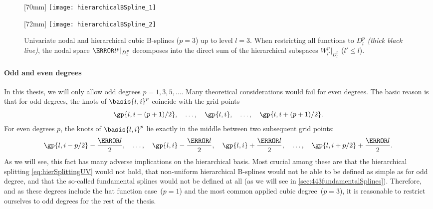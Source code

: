 \begin{figure}
  [70mm]{%
    \texttt{[image: hierarchicalBSpline\_1]}%
  }%
  \hfill%
  \hfill%
  [72mm]{%
    \texttt{[image: hierarchicalBSpline\_2]}%
  }%
  \caption{%
    Univariate nodal and hierarchical cubic B-splines ($p = 3$)
    up to level $l = 3$.
    When restricting all functions to $D_l^p$ \emph{(thick black line)},
    the nodal space $\ns{l}^p|_{D_l^p}$ decomposes into the direct sum
    of the hierarchical subspaces $W_{l'}^p|_{D_l^p}$ ($l' \le l$).%
  }
  \label{fig:hierarchicalBSpline}
\end{figure}

\paragraph{Odd and even degrees}

In this thesis, we will only allow odd degrees $p = 1, 3, 5, \dotsc$.
Many theoretical considerations would fail for even degrees.
The basic reason is that for odd degrees, the knots of
$\basis{l,i}^p$ coincide with the grid points \cite{Valentin14Hierarchische}
\begin{equation}
  \gp{l,i-(p+1)/2},\quad
  \dotsc,\quad
  \gp{l,i},\quad
  \dotsc,\quad
  \gp{l,i+(p+1)/2}.
\end{equation}
For even degrees $p$, the knots of $\basis{l,i}^p$ lie exactly in
the middle between two subsequent grid points:
\begin{equation}
  \gp{l,i-p/2} - \frac{\ms{l}}{2},\quad
  \dotsc,\quad
  \gp{l,i} - \frac{\ms{l}}{2},\quad
  \gp{l,i} + \frac{\ms{l}}{2},\quad
  \dotsc,\quad
  \gp{l,i+p/2} + \frac{\ms{l}}{2}.
\end{equation}
As we will see,
this fact has many adverse implications on the hierarchical basis.
Most crucial among these are
that the hierarchical splitting \eqref{eq:hierSplittingUV} would not hold,
that non-uniform hierarchical B-splines would not be able to be defined as
simple as for odd degree, and
that the so-called fundamental splines would not be defined at all
(as we will see in \cref{sec:443fundamentalSplines}).
Therefore, and
as these degrees include the hat function case~($p = 1$) and the
most common applied cubic degree~($p = 3$),
it is reasonable to restrict ourselves to odd degrees
for the rest of the thesis.



